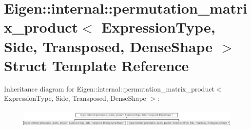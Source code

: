 \hypertarget{struct_eigen_1_1internal_1_1permutation__matrix__product_3_01_expression_type_00_01_side_00_01_t00744509fe9d67128974220180aea840}{}\section{Eigen\+:\+:internal\+:\+:permutation\+\_\+matrix\+\_\+product$<$ Expression\+Type, Side, Transposed, Dense\+Shape $>$ Struct Template Reference}
\label{struct_eigen_1_1internal_1_1permutation__matrix__product_3_01_expression_type_00_01_side_00_01_t00744509fe9d67128974220180aea840}
Inheritance diagram for Eigen\+:\+:internal\+:\+:permutation\+\_\+matrix\+\_\+product$<$ Expression\+Type, Side, Transposed, Dense\+Shape $>$\+:\begin{figure}[H]
\begin{center}
\leavevmode
\includegraphics[height=0.919540cm]{struct_eigen_1_1internal_1_1permutation__matrix__product_3_01_expression_type_00_01_side_00_01_t00744509fe9d67128974220180aea840}
\end{center}
\end{figure}
